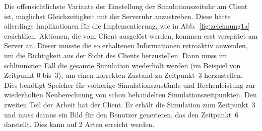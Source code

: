 Die offensichtlichste Variante der Einstellung der Simulationszeituhr am Client ist, möglichst Gleichzeitigkeit mit der Serveruhr anzustreben. Diese hätte allerdings Implikationen für die Implementierung, wie in Abb.~\ref{fig:zeichnung1a} ersichtlich. 
Aktionen, die vom Client ausgelöst werden, kommen erst verspätet am Server an.
Dieser müsste die so erhaltenen Informationen retroaktiv anwenden, um die Richtigkeit aus der Sicht des Clients herzustellen.
Dann muss im schlimmsten Fall die gesamte Simulation wiederholt werden (im Beispiel von Zeitpunkt 0 bis~3), um einen korrekten Zustand zu Zeitpunkt~3 herzustellen. Dies benötigt Speicher für vorherige Simulationszustände und Rechenleistung zur wiederholten Neuberechnung von schon behandelten Simulationszeitpunkten. Den zweiten Teil der Arbeit hat der Client. Er erhält die Simulation zum Zeitpunkt~3 und muss daraus ein Bild für den Benutzer generieren, das den Zeitpunkt~6 darstellt. Dies kann auf 2 Arten erreicht werden.
